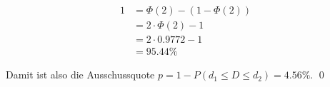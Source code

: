 \documentclass{abgabe}
\begin{document}
\begin{questions}
\begin{parts}
\begin{solution}
\begin{alignat*}{1}
                                       & = \Phi \left( 2 \right) - (1 - \Phi \left( 2 \right))                                                                                                   \\
                                       & = 2 \cdot \Phi \left( 2 \right) - 1                                                                                                                     \\
                                       & = 2 \cdot 0.9772  - 1                                                                                                                                   \\
                                       & = 95.44\%                                                                                                                            
            \end{alignat*}
            
            Damit ist also die Ausschussquote $p = 1 - P(d_1 \leq D \leq d_2) = 4.56\%$.
            \qed
        \end{solution}
        
        \newpage

\end{parts}
\end{questions}
\end{document}
